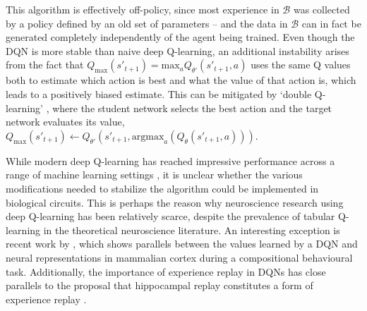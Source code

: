 This algorithm is effectively off-policy, since most experience in $\mathcal{B}$ was collected by a policy defined by an old set of parameters -- and the data in $\mathcal{B}$ can in fact be generated completely independently of the agent being trained.
Even though the DQN is more stable than naive deep Q-learning, an additional instability arises from the fact that $Q_{\text{max}}(s'_{t+1}) = \text{max}_a Q_{\theta'}(s'_{t+1}, a)$ uses the same Q values both to estimate which action is best and what the value of that action is, which leads to a positively biased estimate.
This can be mitigated by `double Q-learning' \citep{van2016deep}, where the student network selects the best action and the target network evaluates its value, $Q_{\text{max}}(s'_{t+1}) \leftarrow Q_{\theta'}(s'_{t+1}, \text{argmax}_a(Q_{\theta}(s'_{t+1}, a)))$.

While modern deep Q-learning has reached impressive performance across a range of machine learning settings \citep{mnih2013playing, lillicrap2015continuous, schaul2015prioritized, kalashnikov2018qt}, it is unclear whether the various modifications needed to stabilize the algorithm could be implemented in biological circuits.
This is perhaps the reason why neuroscience research using deep Q-learning has been relatively scarce, despite the prevalence of tabular Q-learning in the theoretical neuroscience literature.
An interesting exception is recent work by \citet{makino2023arithmetic}, which shows parallels between the values learned by a DQN and neural representations in mammalian cortex during a compositional behavioural task.
Additionally, the importance of experience replay in DQNs \citep{mnih2013playing, schaul2015prioritized} has close parallels to the proposal that hippocampal replay constitutes a form of experience replay \citep{mattar2018prioritized}.

